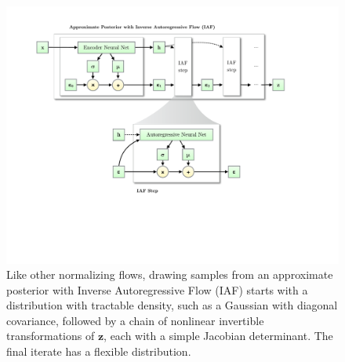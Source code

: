 \documentclass[MAL,biber]{nowfnt} %
\newcommand{\bb}[1]{\mathbf{#1}}
\newcommand{\bz}{\bb{z}}
\begin{document}
\begin{figure}[t]
	\centering
	\includegraphics[width=.99\textwidth]{figures/iaf_figure.pdf}
	\caption{Like other normalizing flows, drawing samples from an approximate posterior with Inverse Autoregressive Flow (IAF) \citep{kingma2016improving} starts with a distribution with tractable density, such as a Gaussian with diagonal covariance, followed by a chain of nonlinear invertible transformations of $\bz$, each with a simple Jacobian determinant. The final iterate has a flexible distribution.}
	\label{fig:iaf_step}
\end{figure}
\end{document}
